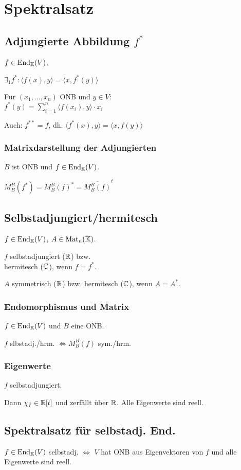\section*{Spektralsatz}

\subsection*{Adjungierte Abbildung $f^*$}
$f\in\operatorname{End}_{\mathbb{K}}(V)$.

$\exists_1 f^*:\langle f(x),y \rangle = \langle x, f^*(y) \rangle$

Für $(x_1,\dots,x_n)$ ONB und $y\in V$: \\
$\displaystyle f^*(y)=\sum_{i=1}^n \langle f(x_i),y \rangle \cdot x_i$

Auch: $f^{**}=f$, dh. $\langle f^*(x),y\rangle = \langle x,f(y)\rangle$

\subsubsection*{Matrixdarstellung der Adjungierten}
$B$ ist ONB und $f\in\operatorname{End}_{\mathbb{K}}(V)$.

$M_B^B(f^*)=M_B^B(f)^* = \overline{M_B^B(f)}^t$

\subsection*{Selbstadjungiert/hermitesch}
$f\in\operatorname{End}_{\mathbb{K}}(V)$, $A\in\operatorname{Mat}_n(\mathbb{K})$.

$f$ selbstadjungiert ($\mathbb{R}$) bzw. \\ hermitesch ($\mathbb{C}$), wenn $f=f^*$.

$A$ symmetrisch ($\mathbb{R}$) bzw. hermitesch ($\mathbb{C}$), wenn $A=A^*$.

\subsubsection*{Endomorphismus und Matrix}
$f\in\operatorname{End}_{\mathbb{K}}(V)$ und $B$ eine ONB.

$f$ slbstadj./hrm. $\iff M_B^B(f)$ sym./hrm.

\subsubsection*{Eigenwerte}
$f$ selbstadjungiert.

Dann $\chi_f \in\mathbb{R}[t]$ und zerfällt über $\mathbb{R}$.
Alle Eigenwerte sind reell.

\subsection*{Spektralsatz für selbstadj. End.}
$f\in\operatorname{End}_{\mathbb{K}}(V)$ selbstadj. $\iff$ $V$ hat ONB aus Eigenvektoren von $f$
und alle Eigenwerte sind reell.

